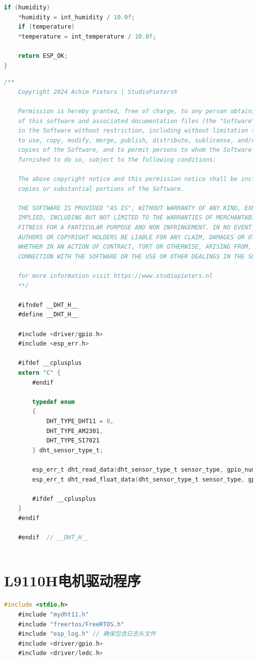 \documentclass[UTF8]{ctexart}
\begin{document}
\begin{appendices}
\begin{lstlisting}[language=C, caption=dht.c]
	if (humidity)
	*humidity = int_humidity / 10.0f;
	if (temperature)
	*temperature = int_temperature / 10.0f;
	
	return ESP_OK;
}

\end{lstlisting}
\begin{lstlisting}[language=C, caption=dht.h]
	/**
	Copyright 2024 Achim Pieters | StudioPieters®
	
	Permission is hereby granted, free of charge, to any person obtaining a copy
	of this software and associated documentation files (the "Software"), to deal
	in the Software without restriction, including without limitation the rights
	to use, copy, modify, merge, publish, distribute, sublicense, and/or sell
	copies of the Software, and to permit persons to whom the Software is
	furnished to do so, subject to the following conditions:
	
	The above copyright notice and this permission notice shall be included in all
	copies or substantial portions of the Software.
	
	THE SOFTWARE IS PROVIDED "AS IS", WITHOUT WARRANTY OF ANY KIND, EXPRESS OR
	IMPLIED, INCLUDING BUT NOT LIMITED TO THE WARRANTIES OF MERCHANTABILITY,
	FITNESS FOR A PARTICULAR PURPOSE AND NON INFRINGEMENT. IN NO EVENT SHALL THE
	AUTHORS OR COPYRIGHT HOLDERS BE LIABLE FOR ANY CLAIM, DAMAGES OR OTHER LIABILITY,
	WHETHER IN AN ACTION OF CONTRACT, TORT OR OTHERWISE, ARISING FROM, OUT OF OR IN
	CONNECTION WITH THE SOFTWARE OR THE USE OR OTHER DEALINGS IN THE SOFTWARE.
	
	for more information visit https://www.studiopieters.nl
	**/
	
	#ifndef __DHT_H__
	#define __DHT_H__
	
	#include <driver/gpio.h>
	#include <esp_err.h>
	
	#ifdef __cplusplus
	extern "C" {
		#endif
		
		typedef enum
		{
			DHT_TYPE_DHT11 = 0,
			DHT_TYPE_AM2301,
			DHT_TYPE_SI7021
		} dht_sensor_type_t;
		
		esp_err_t dht_read_data(dht_sensor_type_t sensor_type, gpio_num_t pin, int16_t *humidity, int16_t *temperature);
		esp_err_t dht_read_float_data(dht_sensor_type_t sensor_type, gpio_num_t pin, float *humidity, float *temperature);
		
		#ifdef __cplusplus
	}
	#endif
	
	#endif  // __DHT_H__
	
\end{lstlisting}
\newpage
\section{L9110H电机驱动程序}
\begin{lstlisting}[language=C, caption=mydht11.c]
	#include <stdio.h>
	#include "mydht11.h"
	#include "freertos/FreeRTOS.h"
	#include "esp_log.h" // 确保包含日志头文件
	#include <driver/gpio.h>
	#include <driver/ledc.h>
	

\end{lstlisting}
\end{appendices}
\end{document}
